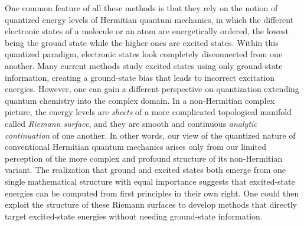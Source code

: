 \documentclass[11pt,a4paper]{article}
\begin{document}
One common feature of all these methods is that they rely on the notion of quantized energy levels of Hermitian quantum mechanics, in which the different electronic states of a molecule or an atom are energetically ordered, the lowest being the ground state while the higher ones are excited states. 
Within this quantized paradigm, electronic states look completely disconnected from one another.
Many current methods study excited states using only ground-state information, creating a ground-state bias that leads to incorrect excitation energies.
However, one can gain a different perspective on quantization extending quantum chemistry into the complex domain.
In a non-Hermitian complex picture, the energy levels are \textit{sheets} of a more complicated topological manifold called \textit{Riemann surface}, and they are smooth and continuous \textit{analytic continuation} of one another.
In other words, our view of the quantized nature of conventional Hermitian quantum mechanics arises only from our limited perception of the more complex and profound structure of its non-Hermitian variant.
The realization that ground and excited states both emerge from one single mathematical structure with equal importance suggests that excited-state energies can be computed from first principles in their own right.
One could then exploit the structure of these Riemann surfaces to develop methods that directly target excited-state energies without needing ground-state information.
\end{document}

